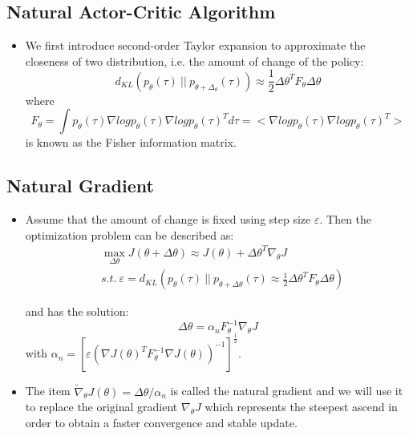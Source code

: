{\begin{pcolumn}

\section{Natural Actor-Critic Algorithm}
\vspace*{-20mm}
%
{\large
\begin{itemize}
	\item We first introduce second-order Taylor expansion to approximate the closeness of two distribution, i.e. the amount of change of the policy: \vspace{-2mm}
\begin{equation}
	d_{KL} (p_\theta(\tau) \ || \ p_{\theta+\Delta_\theta}(\tau)) \approx \frac{1}{2} \Delta \theta^T F_\theta \Delta \theta
\end{equation}
where
\begin{equation}
	F_\theta = \int p_\theta(\tau) \nabla log p_\theta(\tau) \nabla log p_\theta (\tau)^T d\tau = \big<\nabla log p_\theta(\tau) \nabla log p_\theta(\tau)^T\big>
\end{equation}
is known as the Fisher information matrix.

\end{itemize}
\vspace*{2mm}
}

\subsection{Natural Gradient}
\vspace*{-17mm}
%
{\large
\begin{itemize}
	\item Assume that the amount of change is fixed using step size $\varepsilon$. Then the optimization problem can be described as:
\begin{eqnarray}
	& \max \limits_{\Delta\theta} J(\theta + \Delta\theta) \approx J(\theta) + \Delta\theta^T \nabla_\theta J \\
	& s.t.\  \varepsilon = d_{KL}(p_\theta(\tau) \ ||\ p_{\theta+\Delta\theta} (\tau) \approx \frac{1}{2} \Delta \theta^T F_\theta \Delta \theta)   \nonumber
\end{eqnarray}

and has the solution:
\begin{equation}
	\Delta \theta = \alpha_n F_\theta^{-1}\nabla_\theta J
\end{equation}
with $\alpha_n = [\varepsilon(\nabla J(\theta)^TF_\theta^{-1}\nabla J(\theta))^{-1}]^{\frac{1}{2}}$. 
	\item The item $\widetilde \nabla_\theta J(\theta) = \Delta \theta / \alpha_n$ is called the natural gradient and we will use it to replace the original gradient $\nabla_\theta J$ which represents the steepest ascend in order to obtain a faster convergence and stable update.


\end{itemize}}
\end{pcolumn}}
